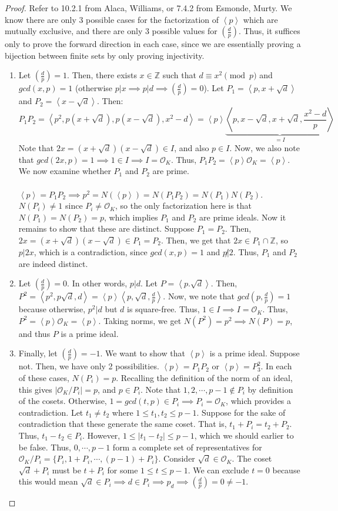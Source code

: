 \documentclass{article}
\newcommand{\lgs}[2]{\left(\frac{#1}{#2}\right)}
\newcommand{\la}{\left\langle}
\newcommand{\ra}{\right\rangle}
\newcommand{\air}{\mathcal{O}_K}
\newcommand{\Z}{\mathbb{Z}}
\begin{document}
\begin{proof}
Refer to 10.2.1 from Alaca, Williams, or 7.4.2 from Esmonde, Murty. We know there are only 3 possible cases for the factorization of $\la p\ra$ which are mutually exclusive, and there are only 3 possible values for $\left(\frac{d}{p}\right)$. Thus, it suffices only to prove the forward direction in each case, since we are essentially proving a bijection between finite sets by only proving injectivity.
\begin{enumerate}[1)]
    \item Let $\left(\frac{d}{p}\right)=1$. Then, there exists $x\in\Z$ such that $d\equiv x^2\pmod{p}$ and $gcd(x,p)=1$ (otherwise $p|x\implies p|d\implies \left(\frac{d}{p}\right)=0$). Let $P_1=\la p,x+\sqrt{d}\ra$ and $P_2=\la x-\sqrt{d}\ra$. Then:
    $$P_1P_2=\la p^2,p(x+\sqrt{d}),p(x-\sqrt{d}),x^2-d\ra = \la p\ra \underbrace{\la p,x-\sqrt{d},x+\sqrt{d},\frac{x^2-d}{p}\ra}_{=I}$$
    Note that $2x=(x+\sqrt{d})(x-\sqrt{d})\in I$, and also $p\in I$. Now, we also note that $gcd(2x,p)=1\implies 1\in I\implies I=\air$. Thus, $P_1P_2=\la p\ra \air = \la p\ra $. We now examine whether $P_1$ and $P_2$ are prime. \\
    \\
    $\la p\ra = P_1P_2\implies p^2=N(\la p\ra) = N(P_1P_2)=N(P_1)N(P_2)$. $N(P_i)\neq 1$ since $P_i\neq \air$, so the only factorization here is that $N(P_1)=N(P_2)=p$, which implies $P_1$ and $P_2$ are prime ideals. Now it remains to show that these are distinct. Suppose $P_1=P_2$. Then, $2x=(x+\sqrt{d})(x-\sqrt{d})\in P_1=P_2$. Then, we get that $2x\in P_1\cap \Z$, so $p|2x$, which is a contradiction, since $gcd(x,p)=1$ and $p\not |2$. Thus, $P_1$ and $P_2$ are indeed distinct.
    \item Let $\lgs{d}{p}=0$. In other words, $p|d$. Let $P=\la p.\sqrt{d}\ra$. Then, $P^2=\la p^2,p\sqrt{d},d\ra=\la p\ra \la p,\sqrt{d},\frac{d}{p}\ra$. Now, we note that $gcd(p,\frac{d}{p})=1$ because otherwise, $p^2|d$ but $d$ is square-free. Thus, $1\in I\implies I=\air$. Thus, $P^2=\la p\ra \air = \la p\ra$. Taking norms, we get $N(P^2)=p^2\implies N(P)=p$, and thus $P$ is a prime ideal.
    \item Finally, let $\lgs{d}{p}=-1$. We want to show that $\la p\ra$ is a prime ideal. Suppose not. Then, we have only 2 possibilities. $\la p\ra = P_1P_2$ or $\la p\ra = P_3^2$. In each of these cases, $N(P_i)=p$. Recalling the definition of the norm of an ideal, this gives $|\air/P_i|=p$, and $p\in P_i$. Note that $1,2,\cdots, p-1\not\in P_i$ by definition of the cosets. Otherwise, $1=gcd(t,p)\in P_i\implies P_i=\air$, which provides a contradiction. Let $t_1\neq t_2$ where $1\leq t_1,t_2\leq p-1$. Suppose for the sake of contradiction that these generate the same coset. That is, $t_1+P_i=t_2+P_2$. Thus, $t_1-t_2\in P_i$. However, $1\leq |t_1-t_2|\leq p-1$, which we should earlier to be false. Thus, $0,\cdots, p-1$ form a complete set of representatives for $\air/P_i=\{P_i, 1+P_i,\cdots, (p-1)+P_i\}$. Consider $\sqrt{d}\in\air$. The coset $\sqrt{d}+P_i$ must be $t+P_i$ for some $1\leq t\leq p-1$. We can exclude $t=0$ because this would mean $\sqrt{d}\in P_i\implies d\in P_i\implies p_d\implies \lgs{d}{p}=0\neq -1$. 

\end{enumerate}
\end{proof}
\end{document}
